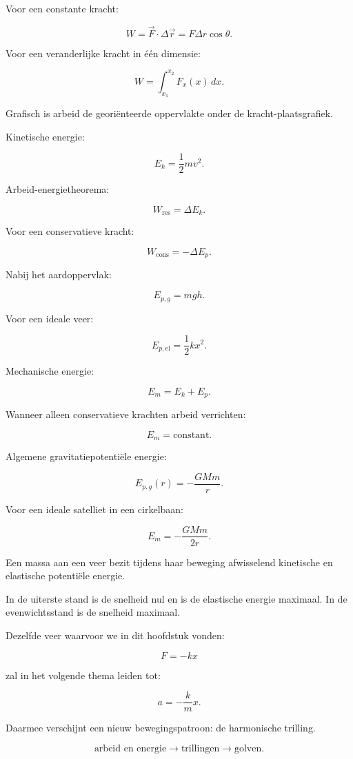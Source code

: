 \documentclass{ximera}
\begin{document}

Voor een constante kracht:

\[
\boxed{
W=\vec F\cdot\Delta\vec r
=F\Delta r\cos\theta.
}
\]

Voor een veranderlijke kracht in één dimensie:

\[
\boxed{
W=\int_{x_1}^{x_2}F_x(x)\,dx.
}
\]

Grafisch is arbeid de georiënteerde oppervlakte onder de
kracht-plaatsgrafiek.

Kinetische energie:

\[
\boxed{
E_k=\frac12mv^2.
}
\]

Arbeid-energietheorema:

\[
\boxed{
W_{\mathrm{res}}=\Delta E_k.
}
\]

Voor een conservatieve kracht:

\[
\boxed{
W_{\mathrm{cons}}=-\Delta E_p.
}
\]

Nabij het aardoppervlak:

\[
\boxed{
E_{p,g}=mgh.
}
\]

Voor een ideale veer:

\[
\boxed{
E_{p,\mathrm{el}}=\frac12kx^2.
}
\]

Mechanische energie:

\[
\boxed{
E_m=E_k+E_p.
}
\]

Wanneer alleen conservatieve krachten arbeid verrichten:

\[
\boxed{
E_m=\text{constant}.
}
\]

Algemene gravitatiepotentiële energie:

\[
\boxed{
E_{p,g}(r)=-\frac{GMm}{r}.
}
\]

Voor een ideale satelliet in een cirkelbaan:

\[
\boxed{
E_m=-\frac{GMm}{2r}.
}
\]





Een massa aan een veer bezit tijdens haar beweging afwisselend kinetische en
elastische potentiële energie.

In de uiterste stand is de snelheid nul en is de elastische energie maximaal.
In de evenwichtsstand is de snelheid maximaal.

Dezelfde veer waarvoor we in dit hoofdstuk vonden:

\[
F=-kx
\]

zal in het volgende thema leiden tot:

\[
a=-\frac{k}{m}x.
\]

Daarmee verschijnt een nieuw bewegingspatroon: de harmonische trilling.

\begin{center}
\[
\boxed{
\text{arbeid en energie}
\longrightarrow
\text{trillingen}
\longrightarrow
\text{golven}.
}
\]
\end{center}
\end{document}
